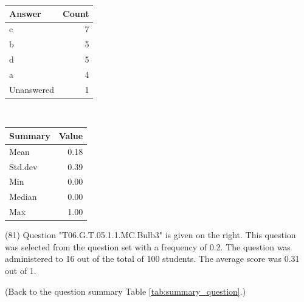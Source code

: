 \documentclass[12pt,nohyper]{tufte-handout}\usepackage[]{graphicx}\usepackage[]{color}
\begin{document}
\begin{center}%
\begin{tabular}{lr}
  \hline
Answer & Count \\ 
  \hline
c &   7 \\ 
  b &   5 \\ 
  d &   5 \\ 
  a &   4 \\ 
  Unanswered &   1 \\ 
   \hline
\end{tabular}
~~~~~~~~%
\begin{tabular}{lr}
  \hline
Summary & Value \\ 
  \hline
Mean & 0.18 \\ 
  Std.dev & 0.39 \\ 
  Min & 0.00 \\ 
  Median & 0.00 \\ 
  Max & 1.00 \\ 
   \hline
\end{tabular}
\end{center}\newpage{} (81) Question "T06.G.T.05.1.1.MC.Bulb3" is given on the right. This question was selected from the question set with a frequency of 0.2. The question was administered to 16 out of the total of 100 students. The average score was 0.31 out of 1.

 (Back to the question summary Table \ref{tab:summary_question}.)
\end{document}
